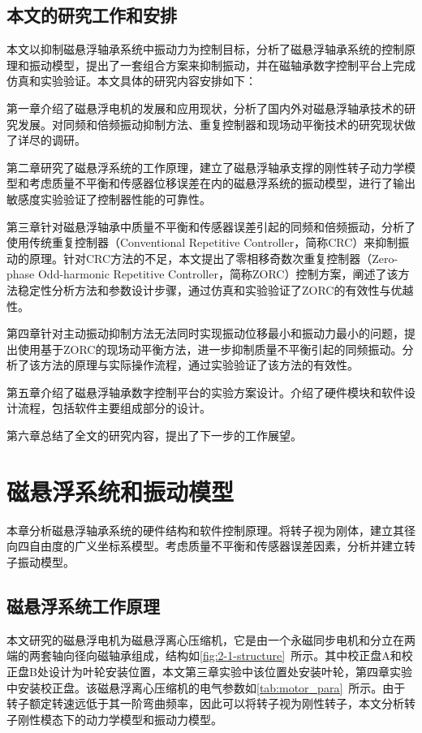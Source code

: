 \documentclass[
  lang=cn,
  degree=master,
  openany,oneside
]{nuaathesis}
\begin{document}
\section{本文的研究工作和安排}
本文以抑制磁悬浮轴承系统中振动力为控制目标，分析了磁悬浮轴承系统的控制原理和振动模型，提出了一套组合方案来抑制振动，并在磁轴承数字控制平台上完成仿真和实验验证。本文具体的研究内容安排如下：

第一章介绍了磁悬浮电机的发展和应用现状，分析了国内外对磁悬浮轴承技术的研究发展。对同频和倍频振动抑制方法、重复控制器和现场动平衡技术的研究现状做了详尽的调研。

第二章研究了磁悬浮系统的工作原理，建立了磁悬浮轴承支撑的刚性转子动力学模型和考虑质量不平衡和传感器位移误差在内的磁悬浮系统的振动模型，进行了输出敏感度实验验证了控制器性能的可靠性。

第三章针对磁悬浮轴承中质量不平衡和传感器误差引起的同频和倍频振动，分析了使用传统重复控制器（Conventional Repetitive Controller，简称CRC）来抑制振动的原理。针对CRC方法的不足，本文提出了零相移奇数次重复控制器（Zero-phase Odd-harmonic Repetitive Controller，简称ZORC）控制方案，阐述了该方法稳定性分析方法和参数设计步骤，通过仿真和实验验证了ZORC的有效性与优越性。

第四章针对主动振动抑制方法无法同时实现振动位移最小和振动力最小的问题，提出使用基于ZORC的现场动平衡方法，进一步抑制质量不平衡引起的同频振动。分析了该方法的原理与实际操作流程，通过实验验证了该方法的有效性。

第五章介绍了磁悬浮轴承数字控制平台的实验方案设计。介绍了硬件模块和软件设计流程，包括软件主要组成部分的设计。

第六章总结了全文的研究内容，提出了下一步的工作展望。

\chapter{磁悬浮系统和振动模型}
本章分析磁悬浮轴承系统的硬件结构和软件控制原理。将转子视为刚体，建立其径向四自由度的广义坐标系模型。考虑质量不平衡和传感器误差因素，分析并建立转子振动模型。

\section{磁悬浮系统工作原理}
本文研究的磁悬浮电机为磁悬浮离心压缩机，它是由一个永磁同步电机和分立在两端的两套轴向径向磁轴承组成，结构如\autoref{fig:2-1-structure}~所示。其中校正盘A和校正盘B处设计为叶轮安装位置，本文第三章实验中该位置处安装叶轮，第四章实验中安装校正盘。该磁悬浮离心压缩机的电气参数如\autoref{tab:motor_para}~所示。由于转子额定转速远低于其一阶弯曲频率，因此可以将转子视为刚性转子，本文分析转子刚性模态下的动力学模型和振动力模型。
\end{document}
